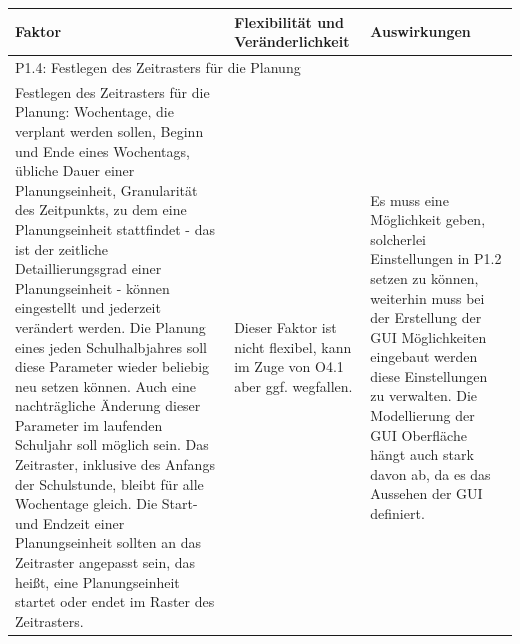 \documentclass[fontsize=12pt,paper=a4,twoside]{scrartcl}
\begin{document}
\begin{tabularx}{\textwidth}{|X|X|X|}
\hline
\textbf{Faktor} & \textbf{Flexibilität und Veränderlichkeit} & \textbf{Auswirkungen}\\\hline
\hline
\hline
\multicolumn{3}{|l|}{P1.4: Festlegen des Zeitrasters für die Planung}\\\hline
Festlegen des Zeitrasters für die Planung: Wochentage, die verplant werden sollen, Beginn und Ende eines Wochentags, übliche Dauer einer Planungseinheit, Granularität des Zeitpunkts, zu dem eine Planungseinheit stattfindet - das ist der zeitliche Detaillierungsgrad einer Planungseinheit - können eingestellt und jederzeit verändert werden. Die Planung eines jeden Schulhalbjahres soll diese Parameter wieder beliebig neu setzen können. Auch eine nachträgliche Änderung dieser Parameter im laufenden Schuljahr soll möglich sein. Das Zeitraster, inklusive des Anfangs der Schulstunde, bleibt für alle Wochentage gleich. Die Start- und Endzeit einer Planungseinheit sollten an das Zeitraster angepasst sein, das heißt, eine Planungseinheit startet oder endet im Raster des Zeitrasters. & Dieser Faktor ist nicht flexibel, kann im Zuge von O4.1 aber ggf. wegfallen. & Es muss eine Möglichkeit geben, solcherlei Einstellungen in P1.2 setzen zu können, weiterhin muss bei der Erstellung der GUI Möglichkeiten eingebaut werden diese Einstellungen zu verwalten. Die Modellierung der GUI Oberfläche hängt auch stark davon ab, da es das Aussehen der GUI definiert. \\\hline
\end{tabularx} \newpage
\end{document}
